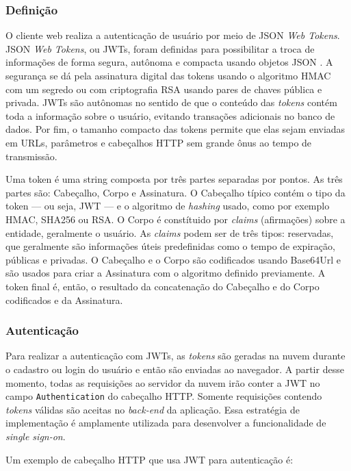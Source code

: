 \subsubsection{Definição}
O cliente web realiza a autenticação de usuário por meio de JSON \textit{Web Tokens}. JSON \textit{Web Tokens}, ou JWTs, foram definidas para possibilitar a troca de informações de forma segura, autônoma e compacta usando objetos JSON \cite{rfc7519}. A segurança se dá pela assinatura digital das tokens usando o algoritmo HMAC com um segredo ou com criptografia RSA usando pares de chaves pública e privada. JWTs são autônomas no sentido de que o conteúdo das \emph{tokens} contém toda a informação sobre o usuário, evitando transações adicionais no banco de dados. Por fim, o tamanho compacto das tokens permite que elas sejam enviadas em URLs, parâmetros e cabeçalhos HTTP sem grande ônus ao tempo de transmissão.

Uma token é uma string composta por três partes separadas por pontos. As três partes são: Cabeçalho, Corpo e Assinatura. O Cabeçalho típico contém o tipo da token --- ou seja, JWT --- e o algoritmo de \textit{hashing} usado, como por exemplo HMAC, SHA256 ou RSA. O Corpo é constítuido por \textit{claims} (afirmações) sobre a entidade, geralmente o usuário. As \textit{claims} podem ser de três tipos: reservadas, que geralmente são informações úteis predefinidas como o tempo de expiração, públicas e privadas. O Cabeçalho e o Corpo são codificados usando Base64Url e são usados para criar a Assinatura com o algoritmo definido previamente. A token final é, então, o resultado da concatenação do Cabeçalho e do Corpo codificados e da Assinatura.

\subsubsection{Autenticação}

Para realizar a autenticação com JWTs, as \emph{tokens} são geradas na nuvem durante o cadastro ou login do usuário e então são enviadas ao navegador. A partir desse momento, todas as requisições ao servidor da nuvem irão conter a JWT no campo \texttt{Authentication} do cabeçalho HTTP. Somente requisições contendo \emph{tokens} válidas são aceitas no \emph{back-end} da aplicação. Essa estratégia de implementação é amplamente utilizada para desenvolver a funcionalidade de \textit{single sign-on}.

Um exemplo de cabeçalho HTTP que usa JWT para autenticação é:


